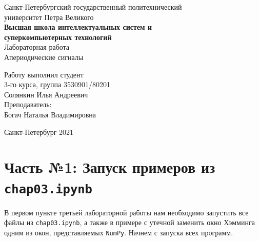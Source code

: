 \documentclass[a4paper]{article}
\begin{document}
    \begin{center}
        \begin{center}
        \hfill \break
        \normalsize{Санкт-Петербургский государственный политехнический}\\
        \normalsize{университет Петра Великого}\\
        \hfill \break
        \normalsize{\textbf{Высшая школа интеллектуальных систем и}}\\ 
        \normalsize{\textbf{суперкомпьютерных технологий}}\\ 
        \hfill \break
        \hfill \break
        \hfill \break
        \normalsize{Лабораторная работа}\\
        \hfill \break
        \hfill \break
        \normalsize{\LARGE Апериодические сигналы}\\
        \end{center}
        \hfill \break
        \hfill \break
        \hfill \break
        \hfill \break
        \hfill \break
        \hfill \break
        \hfill \break
        \hfill \break
        \hfill \break
        \hfill \break
        \begin{flushright}
            \normalsize{Работу выполнил студент}\\
            \normalsize{3-го курса, группа 3530901/80201}\\
            \normalsize{Солянкин Илья Андреевич}\\
            \hfill \break
            \normalsize{Преподаватель:}\\
            \normalsize{Богач Наталья Владимировна}\\
        \end{flushright}
        \hfill \break
        \hfill \break
        \hfill \break
        \hfill \break
        \begin{center} Санкт-Петербург 2021 \end{center}
        \thispagestyle{empty}
    \end{center}
    
    \newpage
        \tableofcontents
    
    \newpage
         \listoffigures
    
    \newpage
         \lstlistoflistings   
     
    \newpage
        \section{Часть №1: Запуск примеров из \texttt{chap03.ipynb}}
            В первом пункте третьей лабораторной работы нам необходимо запустить все файлы из \texttt{chap03.ipynb}, а также в примере с утечной заменить окно Хэмминга одним из окон, представляемых \texttt{NumPy}.
            Начнем с запуска всех программ.
            
\end{document}
